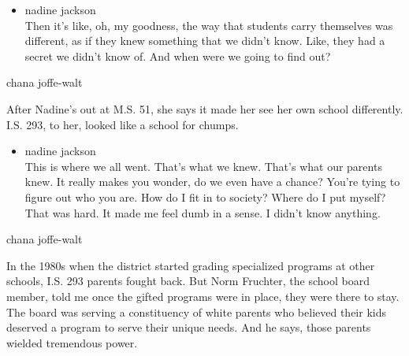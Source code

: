\begin{itemize}
\tightlist
\item
  nadine jackson\\
  Then it's like, oh, my goodness, the way that students carry
  themselves was different, as if they knew something that we didn't
  know. Like, they had a secret we didn't know of. And when were we
  going to find out?
\end{itemize}

chana joffe-walt

After Nadine's out at M.S. 51, she says it made her see her own school
differently. I.S. 293, to her, looked like a school for chumps.

\begin{itemize}
\tightlist
\item
  nadine jackson\\
  This is where we all went. That's what we knew. That's what our
  parents knew. It really makes you wonder, do we even have a chance?
  You're tying to figure out who you are. How do I fit in to society?
  Where do I put myself? That was hard. It made me feel dumb in a sense.
  I didn't know anything.
\end{itemize}

chana joffe-walt

In the 1980s when the district started grading specialized programs at
other schools, I.S. 293 parents fought back. But Norm Fruchter, the
school board member, told me once the gifted programs were in place,
they were there to stay. The board was serving a constituency of white
parents who believed their kids deserved a program to serve their unique
needs. And he says, those parents wielded tremendous power.

